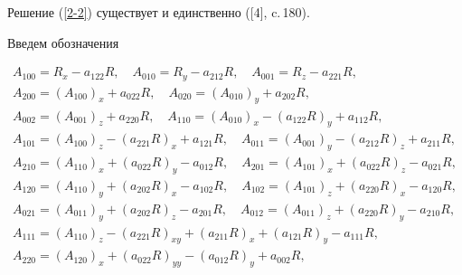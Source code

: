 Решение (\ref{2-2}) существует и единственно ([4], c.\,180).





Введем обозначения


\begin{gather*}


A_{100}=R_{x}-a_{122}R,\quad A_{010}=R_{y}-a_{212}R,\quad


A_{001}=R_{z}-a_{221}R,\\


%


A_{200}=(A_{100})_{x}+a_{022}R,\quad


A_{020}=(A_{010})_{y}+a_{202}R,\\


%


A_{002}=(A_{001})_{z}+a_{220}R,\quad


A_{110}=(A_{010})_{x}-(a_{122}R)_{y}+a_{112}R,\\


%


A_{101}=(A_{100})_{z}-(a_{221}R)_{x}+a_{121}R,\quad


A_{011}=(A_{001})_{y}-(a_{212}R)_{z}+a_{211}R,\\


%


A_{210}=(A_{110})_{x}+(a_{022}R)_{y}-a_{012}R,\quad


A_{201}=(A_{101})_{x}+(a_{022}R)_{z}-a_{021}R,\\


%


A_{120}=(A_{110})_{y}+(a_{202}R)_{x}-a_{102}R,\quad


A_{102}=(A_{101})_{z}+(a_{220}R)_{x}-a_{120}R,\\


%


A_{021}=(A_{011})_{y}+(a_{202}R)_{z}-a_{201}R,\quad


A_{012}=(A_{011})_{z}+(a_{220}R)_{y}-a_{210}R,\\


%


A_{111}=(A_{110})_{z}-(a_{221}R)_{xy}+(a_{211}R)_{x}


+(a_{121}R)_{y}-a_{111}R,\\


%


A_{220}=(A_{120})_{x}+(a_{022}R)_{yy}-(a_{012}R)_{y}+a_{002}R,\\


%



\end{gather*}
